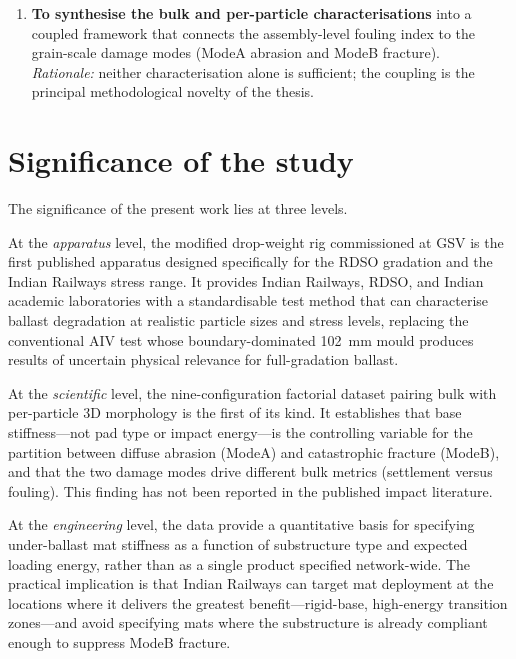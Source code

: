 \begin{enumerate}[label=(\roman*),leftmargin=*,itemsep=6pt]
          22-descriptor analysis pipeline.\\
          \textit{Rationale:} the bulk fouling index cannot distinguish
          diffuse abrasion from catastrophic fracture. Only a
          per-particle protocol resolves this mechanistic distinction.
    \item \textbf{To synthesise the bulk and per-particle
          characterisations} into a coupled framework that connects the
          assembly-level fouling index to the grain-scale damage modes
          (\gls{ModeA} abrasion and \gls{ModeB} fracture).\\
          \textit{Rationale:} neither characterisation alone is
          sufficient; the coupling is the principal methodological
          novelty of the thesis.
\end{enumerate}

\section{Significance of the study}
\label{sec:intro-significance}

The significance of the present work lies at three levels.

At the \emph{apparatus} level, the modified drop-weight rig commissioned
at \gls{GSV} is the first published apparatus designed specifically for
the \gls{RDSO} gradation and the Indian Railways stress range. It
provides Indian Railways, \gls{RDSO}, and Indian academic laboratories
with a standardisable test method that can characterise ballast
degradation at realistic particle sizes and stress levels, replacing the
conventional \gls{AIV} test whose boundary-dominated
\SI{102}{\milli\metre} mould produces results of uncertain physical
relevance for full-gradation ballast.

At the \emph{scientific} level, the nine-configuration factorial dataset
pairing bulk \FIIN{} with per-particle 3D morphology is the first of its
kind. It establishes that base stiffness---not pad type or impact
energy---is the controlling variable for the partition between diffuse
abrasion (\gls{ModeA}) and catastrophic fracture (\gls{ModeB}), and
that the two damage modes drive different bulk metrics (settlement versus
fouling). This finding has not been reported in the published impact
literature.

At the \emph{engineering} level, the data provide a quantitative basis
for specifying under-ballast mat stiffness as a function of substructure
type and expected loading energy, rather than as a single product
specified network-wide. The practical implication is that Indian Railways
can target mat deployment at the locations where it delivers the greatest
benefit---rigid-base, high-energy transition zones---and avoid specifying
mats where the substructure is already compliant enough to suppress
\gls{ModeB} fracture.

